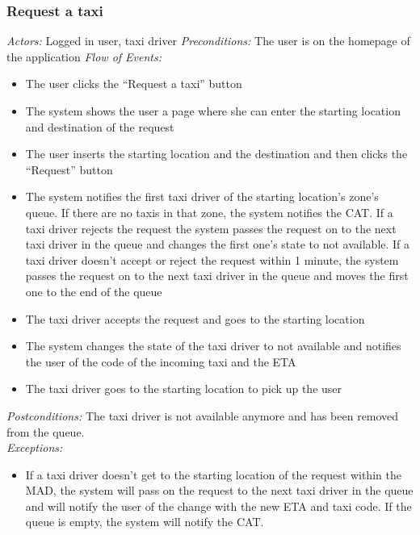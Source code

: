 \documentclass{article}
\begin{document}
\subsubsection{Request a taxi}
\textit{Actors:} Logged in user, taxi driver
\textit{Preconditions:} The user is on the homepage of the application
\textit{Flow of Events:}
\begin{itemize}
	\item  The user clicks the ``Request a taxi'' button
	\item  The system shows the user a page where she can enter the starting location and destination of the request
	\item  The user inserts the starting location and the destination and then clicks the ``Request'' button
	\item  The system notifies the first taxi driver of the starting location's zone's queue. If there are no taxis in that zone, the system notifies the CAT\@. If a taxi driver rejects the request the system passes the request on to the next taxi driver in the queue and changes the first one's state to not available. If a taxi driver doesn't accept or reject the request within 1 minute, the system passes the request on to the next taxi driver in the queue and moves the first one to the end of the queue
	\item  The taxi driver accepts the request and goes to the starting location
	\item  The system changes the state of the taxi driver to not available and notifies the user of the code of the incoming taxi and the ETA 
	\item The taxi driver goes to the starting location to pick up the user
\end{itemize}
\textit{Postconditions:} The taxi driver is not available anymore and has been removed from the queue.
\\\textit{Exceptions:}
\begin{itemize}
	\item If a taxi driver doesn't get to the starting location of the request within the MAD, the system will pass on the request to the next taxi driver in the queue and will notify the user of the change with the new ETA and taxi code. If the queue is empty, the system will notify the CAT.\@
\end{itemize}
\end{document}
